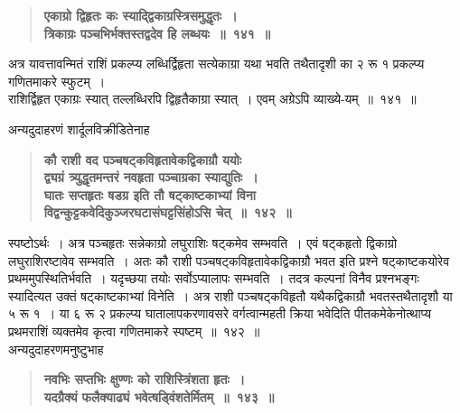 \documentclass[11pt, openany]{book}
\begin{document}
\begin{sloppypar}
 \label{9.141}
\begin{quote}
{\large \textbf{{\color{purple}एकाग्रो द्विहृतः कः स्याद्द्विकाग्रस्त्रिसमुद्धृतः~।\\
त्रिकाग्रः पञ्चभिर्भक्तस्तद्वदेव हि लब्धयः~॥~१४१~॥}}}
\end{quote}

अत्र यावत्तावन्मितं राशिं प्रकल्प्य लब्धिर्द्विहृता सत्येकाग्रा यथा भवति तथैतादृशी का २ रू १ प्रकल्प्य गणितमाकरे स्फुटम्~।\\

राशिर्द्विहृत एकाग्रः स्यात् तल्लब्धिरपि द्विहृतैकाग्रा स्यात्~। एवम् अग्रेऽपि व्याख्ये-यम्~॥~१४१~॥
\end{sloppypar}

\newpage

\begin{sloppypar}
{\small अन्यदुदाहरणं शार्दूलविक्रीडितेनाह\textendash }

 \label{9.142}
\begin{quote}
{\large \textbf{{\color{purple}कौ राशी वद पञ्चषट्कविहृतावेकद्विकाग्रौ ययोः\\
द्व्यग्रं त्र्युद्धृतमन्तरं नवहृता पञ्चाग्रका स्याद्युतिः~।\\
घातः सप्तहृतः षडग्र इति तौ षट्काष्टकाभ्यां विना\\
विद्वन्कुट्टकवेदिकुञ्जरघटासंघट्टसिंहोऽसि चेत्~॥~१४२~॥}}}
\end{quote}

स्पष्टोऽर्थः~। अत्र पञ्चहृतः सन्नेकाग्रो लघुराशिः षट्कमेव सम्भवति~। एवं षट्कहृतो द्विकाग्रो लघुराशिरष्टावेव सम्भवति~। अतः कौ राशी पञ्चषट्कविहृतावेकद्विकाग्रौ भवत इति प्रश्ने षट्काष्टकयोरेव प्रथममुपस्थितिर्भवति~। यदृच्छया तयोः सर्वोऽप्यालापः सम्भवति~। तदत्र कल्पनां विनैव प्रश्नभङ्गः स्यादित्यत उक्तं षट्काष्टकाभ्यां विनेति~। अत्र राशी पञ्चषट्कविहृतौ यथैकद्विकाग्रौ भवतस्तथैतादृशौ या ५ रू १~। या ६ रू २ प्रकल्प्य घातालापकरणावसरे वर्गत्वान्महती क्रिया भवेदिति पीतकमेकेनोत्थाप्य प्रथमराशिं व्यक्तमेव कृत्वा गणितमाकरे स्पष्टम्~॥~१४२~॥\\

{\small अन्यदुदाहरणमनुष्टुभाह\textendash }

 \label{9.143}
\begin{quote}
{\large \textbf{{\color{purple}नवभिः सप्तभिः क्षुण्णः को राशिस्त्रिंशता हृतः~।\\
यदग्रैक्यं फलैक्याढ्यं भवेत्षड्विंशतेर्मितम्~॥~१४३~॥}}}
\end{quote}


\end{sloppypar}
\end{document}
